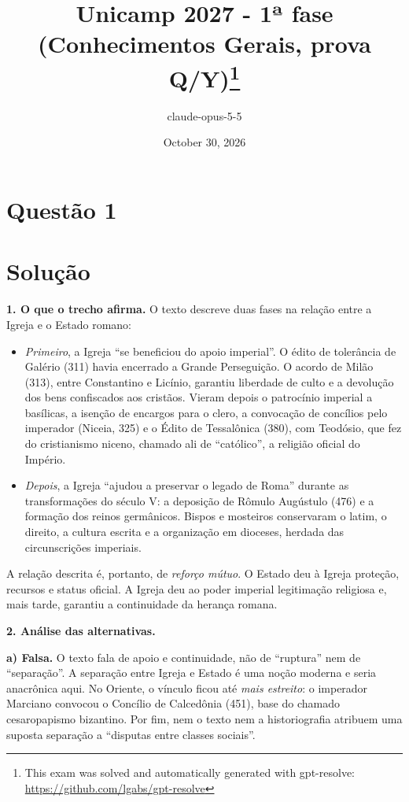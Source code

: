 \documentclass{article}%
\title{Unicamp 2027 - 1ª fase (Conhecimentos Gerais, prova Q/Y)\thanks{This exam was solved and automatically generated with gpt-resolve: \url{https://github.com/lgabs/gpt-resolve}}}%
\author{claude{-}opus{-}5{-}5}%
\date{October 30, 2026}%
\begin{document}
%
\normalsize%
\maketitle%
\section*{Questão 1}

\section*{Solução}

\textbf{1. O que o trecho afirma.} O texto descreve duas fases na relação entre a Igreja e o Estado romano:
\begin{itemize}
  \item \emph{Primeiro}, a Igreja ``se beneficiou do apoio imperial''. O édito de tolerância de Galério (311) havia encerrado a Grande Perseguição. O acordo de Milão (313), entre Constantino e Licínio, garantiu liberdade de culto e a devolução dos bens confiscados aos cristãos. Vieram depois o patrocínio imperial a basílicas, a isenção de encargos para o clero, a convocação de concílios pelo imperador (Niceia, 325) e o Édito de Tessalônica (380), com Teodósio, que fez do cristianismo niceno, chamado ali de ``católico'', a religião oficial do Império.
  \item \emph{Depois}, a Igreja ``ajudou a preservar o legado de Roma'' durante as transformações do século V: a deposição de Rômulo Augústulo (476) e a formação dos reinos germânicos. Bispos e mosteiros conservaram o latim, o direito, a cultura escrita e a organização em dioceses, herdada das circunscrições imperiais.
\end{itemize}
A relação descrita é, portanto, de \emph{reforço mútuo}. O Estado deu à Igreja proteção, recursos e status oficial. A Igreja deu ao poder imperial legitimação religiosa e, mais tarde, garantiu a continuidade da herança romana.

\textbf{2. Análise das alternativas.}

\textbf{a) Falsa.} O texto fala de apoio e continuidade, não de ``ruptura'' nem de ``separação''. A separação entre Igreja e Estado é uma noção moderna e seria anacrônica aqui. No Oriente, o vínculo ficou até \emph{mais estreito}: o imperador Marciano convocou o Concílio de Calcedônia (451), base do chamado cesaropapismo bizantino. Por fim, nem o texto nem a historiografia atribuem uma suposta separação a ``disputas entre classes sociais''.
\end{document}
